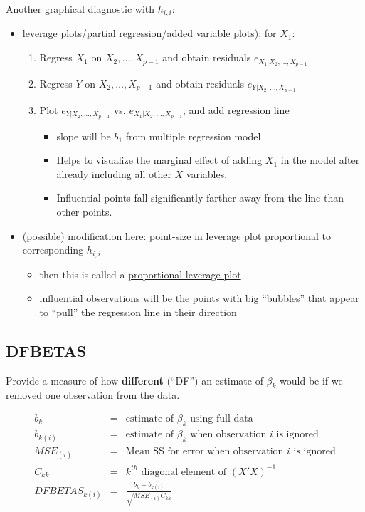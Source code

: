 \documentclass[12pt]{../notes}
\begin{document}
\nspace
Another graphical diagnostic with $h_{i,i}$:
\begin{itemize}
 \item leverage plots/partial regression/added variable plots); for $X_1$:
   \begin{enumerate}
     \item Regress $X_1$ on $X_2, \ldots, X_{p-1}$ and obtain residuals $e_{X_1 | X_2, \ldots, X_{p-1}}$
     \item Regress $Y$ on $X_2, \ldots, X_{p-1}$ and obtain residuals $e_{Y | X_2, \ldots, X_{p-1}}$
     \item Plot $e_{Y | X_2, \ldots, X_{p-1}}$ vs. $e_{X_1 | X_2, \ldots, X_{p-1}}$, and add regression line
       \begin{itemize}
         \item slope will be $b_1$ from multiple regression model
         \item Helps to visualize the marginal effect of adding $X_1$ in the model after already including all other $X$ variables. 
         \item Influential points fall significantly farther away from the line than other points. 
       \end{itemize}
   \end{enumerate}
 \item (possible) modification here: point-size in leverage plot proportional to corresponding $h_{i,i}$ 
   \begin{itemize}
     \item then this is called a \underline{proportional leverage plot}
     \item influential observations will be the points with big ``bubbles'' that appear to ``pull''
      the regression line in their direction
   \end{itemize}
\end{itemize}


\subsection{DFBETAS} 
Provide a measure of how \textbf{different} (``DF'') an estimate of $\beta_k$ would be if we removed one observation from the data. 

    \begin{eqnarray}
       b_k & = & \mbox{estimate of $\beta_k$ using full data} \nonumber \\
       b_{k(i)} & = & \mbox{estimate of $\beta_k$ when observation $i$ is ignored} \nonumber \\
       MSE_{(i)} & = & \mbox{Mean SS for error when observation $i$ is ignored} \nonumber \\
       C_{kk} & = & \mbox{$k^{th}$ diagonal element of } \left( {X}' {X} \right) ^{-1} \nonumber\\
       DFBETAS_{k(i)} & = & \frac{b_k-b_{k(i)}}{\sqrt{MSE_{(i)}C_{kk}}} \nonumber
     \end{eqnarray}
     
\end{document}
